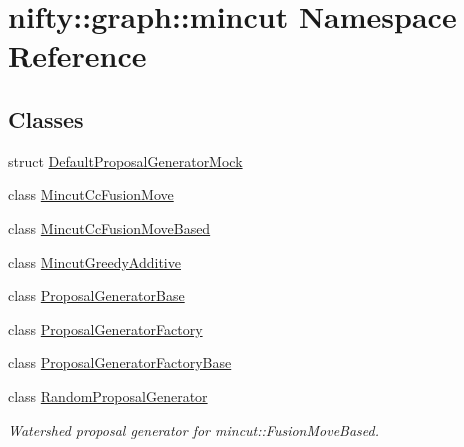 \hypertarget{namespacenifty_1_1graph_1_1mincut}{}\section{nifty\+:\+:graph\+:\+:mincut Namespace Reference}
\label{namespacenifty_1_1graph_1_1mincut}
\subsection*{Classes}
\begin{DoxyCompactItemize}
\item 
struct \hyperlink{structnifty_1_1graph_1_1mincut_1_1DefaultProposalGeneratorMock}{Default\+Proposal\+Generator\+Mock}
\item 
class \hyperlink{classnifty_1_1graph_1_1mincut_1_1MincutCcFusionMove}{Mincut\+Cc\+Fusion\+Move}
\item 
class \hyperlink{classnifty_1_1graph_1_1mincut_1_1MincutCcFusionMoveBased}{Mincut\+Cc\+Fusion\+Move\+Based}
\item 
class \hyperlink{classnifty_1_1graph_1_1mincut_1_1MincutGreedyAdditive}{Mincut\+Greedy\+Additive}
\item 
class \hyperlink{classnifty_1_1graph_1_1mincut_1_1ProposalGeneratorBase}{Proposal\+Generator\+Base}
\item 
class \hyperlink{classnifty_1_1graph_1_1mincut_1_1ProposalGeneratorFactory}{Proposal\+Generator\+Factory}
\item 
class \hyperlink{classnifty_1_1graph_1_1mincut_1_1ProposalGeneratorFactoryBase}{Proposal\+Generator\+Factory\+Base}
\item 
class \hyperlink{classnifty_1_1graph_1_1mincut_1_1RandomProposalGenerator}{Random\+Proposal\+Generator}
\begin{DoxyCompactList}\small\item\em Watershed proposal generator for mincut\+::\+Fusion\+Move\+Based. \end{DoxyCompactList}\end{DoxyCompactItemize}
